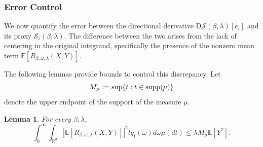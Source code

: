 \documentclass[sn-mathphys-num]{sn-jnl}%
\numberwithin{equation}{section}
\newcommand{\R}{\mathbb{R}}
\newcommand{\E}{\mathbb{E}}
\newtheorem{lemma}{Lemma}
\newcommand{\supp}{\mathop{\rm supp}}
\theoremstyle{thmstyleone}%
\theoremstyle{thmstyletwo}%
\theoremstyle{thmstylethree}%
\begin{document}
\subsubsection{Error Control}
\label{sec:error-control}
We now quantify the error between the directional derivative $\mathrm{D}\mathcal{J}(\beta, \lambda)[e_i]$ and 
its proxy $\mathcal{S}_i(\beta, \lambda)$. The difference between the two arises from the lack of centering 
in the original integrand, specifically the presence of the nonzero mean term $\E[R_{\beta, \omega, \lambda}(X, Y)]$. 


The following lemmas provide bounds to control this discrepancy. Let 
\begin{equation*}
	M_\mu := \sup \{t: t\in \supp(\mu)\}
\end{equation*}  
denote the upper endpoint of the support of the measure $\mu$. 
\begin{lemma}
\label{lemma:residual-bound-one}
For every $\beta, \lambda$, 
\begin{equation*}
	\int_0^\infty \int_{\R^d} |\E[R_{\beta, \omega, \lambda}(X, Y)]|^2 t q_t(\omega) d\omega \mu(dt) 
		\le \lambda M_\mu \E[Y^2]. 
\end{equation*}
\end{lemma} 
\end{document}

